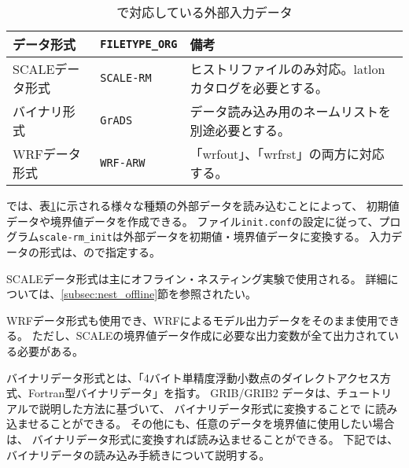 \section{\SecInputDataSetting} \label{sec:adv_datainput}

\begin{table}[htb]
\begin{center}
\caption{\scalelib で対応している外部入力データ}
\begin{tabularx}{150mm}{|l|l|X|} \hline
 \rowcolor[gray]{0.9} データ形式      & \verb|FILETYPE_ORG|  & 備考 \\ \hline
 SCALEデータ形式   & \verb|SCALE-RM|     &  ヒストリファイルのみ対応。latlonカタログを必要とする。 \\ \hline
 バイナリ形式 & \verb|GrADS|        & データ読み込み用のネームリストを別途必要とする。       \\ \hline
 WRFデータ形式     & \verb|WRF-ARW|      & 「wrfout」、「wrfrst」の両方に対応する。          \\ \hline
\end{tabularx}
\label{tab:inputdata_format}
\end{center}
\end{table}

\scalerm では、表\ref{tab:inputdata_format}に示される様々な種類の外部データを読み込むことによって、
初期値データや境界値データを作成できる。
ファイル\verb|init.conf|の設定に従って、プログラム\verb|scale-rm_init|は外部データを初期値・境界値データに変換する。
入力データの形式は、ので指定する。

SCALEデータ形式は主にオフライン・ネスティング実験で使用される。
詳細については、\ref{subsec:nest_offline}節を参照されたい。


WRFデータ形式も使用でき、WRFによるモデル出力データをそのまま使用できる。
ただし、SCALEの境界値データ作成に必要な出力変数が全て出力されている必要がある。

バイナリデータ形式とは、「4バイト単精度浮動小数点のダイレクトアクセス方式、Fortran型バイナリデータ」を指す。
GRIB/GRIB2 データは、チュートリアルで説明した方法に基づいて、
バイナリデータ形式に変換することで {\scalerm} に読み込ませることができる。
その他にも、任意のデータを境界値に使用したい場合は、
バイナリデータ形式に変換すれば読み込ませることができる。
下記では、バイナリデータの読み込み手続きについて説明する。


